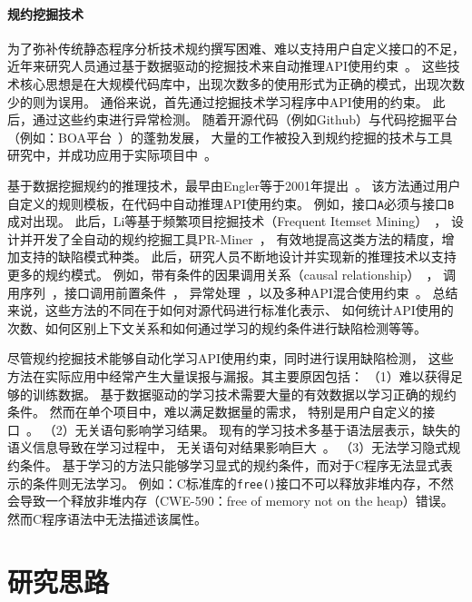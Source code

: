 \paragraph{规约挖掘技术}
为了弥补传统静态程序分析技术规约撰写困难、难以支持用户自定义接口的不足，
近年来研究人员通过基于数据驱动的挖掘技术来自动推理API使用约束~\cite{13survey}。
这些技术核心思想是在大规模代码库中，出现次数多的使用形式为正确的模式，出现次数少的则为误用。
通俗来说，首先通过挖掘技术学习程序中API使用的约束。
此后，通过这些约束进行异常检测。
随着开源代码（例如Github）与代码挖掘平台（例如：BOA平台~\cite{15-tosem-boa}）的蓬勃发展，
大量的工作被投入到规约挖掘的技术与工具研究中，并成功应用于实际项目中~\cite{survey18}。

基于数据挖掘规约的推理技术，最早由Engler等于2001年提出~\cite{01-sosp-mining}。
该方法通过用户自定义的规则模板，在代码中自动推理API使用约束。
例如，接口\texttt{A}必须与接口\texttt{B}成对出现。
此后，Li等基于频繁项目挖掘技术（Frequent Itemset Mining）~\cite{03-fimi-frequent}，
设计并开发了全自动的规约挖掘工具PR-Miner~\cite{05-fse-prminer}，
有效地提高这类方法的精度，增加支持的缺陷模式种类。
此后，研究人员不断地设计并实现新的推理技术以支持更多的规约模式。
例如，带有条件的因果调用关系（causal relationship）~\cite{07-fse-temporal}，
调用序列~\cite{09-ase-sequence}，接口调用前置条件~\cite{14-fse-pre}，
异常处理~\cite{16-ase-apex}，以及多种API混合使用约束~\cite{16-sec-apisan}。
总结来说，这些方法的不同在于如何对源代码进行标准化表示、
如何统计API使用的次数、如何区别上下文关系和如何通过学习的规约条件进行缺陷检测等等。

尽管规约挖掘技术能够自动化学习API使用约束，同时进行误用缺陷检测，
这些方法在实际应用中经常产生大量误报与漏报。其主要原因包括：
（1）难以获得足够的训练数据。
基于数据驱动的学习技术需要大量的有效数据以学习正确的规约条件。
然而在单个项目中，难以满足数据量的需求，
特别是用户自定义的接口~\cite{15-kernel-sv,survey18}。
（2）无关语句影响学习结果。
现有的学习技术多基于语法层表示，缺失的语义信息导致在学习过程中，
无关语句对结果影响巨大~\cite{16-icse-antminer}。
（3）无法学习隐式规约条件。
基于学习的方法只能够学习显式的规约条件，而对于C程序无法显式表示的条件则无法学习。
例如：C标准库的\texttt{free()}接口不可以释放非堆内存，不然会导致一个释放非堆内存（CWE-590：free of memory not on the heap）错误。
然而C程序语法中无法描述该属性。


\section{研究思路}


